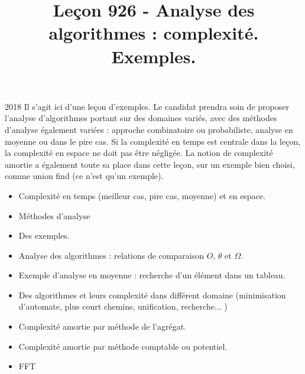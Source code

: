 \documentclass{agregfiche}
\title{Leçon 926 - Analyse des algorithmes : complexité. Exemples.}
\begin{document}
\maketitle

\secrapports
\begin{rapport}{2018}
    Il s’agit ici d’une leçon d’exemples. Le candidat prendra soin de proposer l’analyse d’algorithmes portant
    sur des domaines variés, avec des méthodes d’analyse également variées : approche combinatoire ou
    probabiliste, analyse en moyenne ou dans le pire cas.
    Si la complexité en temps est centrale dans la leçon, la complexité en espace ne doit pas être négligée.
    La notion de complexité amortie a également toute sa place dans cette leçon, sur un exemple bien
    choisi, comme union find (ce n’est qu’un exemple).
\end{rapport}

\secindispensables

\begin{itemize}
        \item Complexité en temps (meilleur cas, pire cas, moyenne) 
        et en espace.
	\item Méthodes d'analyse
    \item Des exemples.
\end{itemize}

\secasavoir

\begin{itemize}
	\item Analyse des algorithmes : relations de comparaison $O$, $\theta$ et $\Omega$.
    \item Exemple d’analyse en moyenne : recherche d’un élément dans un tableau.
    \item Des algorithmes et leurs complexité dans différent domaine (minimisation d'automate, plus court chemins, unification, recherche... )
    	\item Complexité amortie par méthode de l'agrégat.
        
\end{itemize}

\secidees

\begin{itemize}
    	\item Complexité amortie par méthode comptable ou potentiel.
        \item FFT
\end{itemize}

\secpieges
\end{document}
